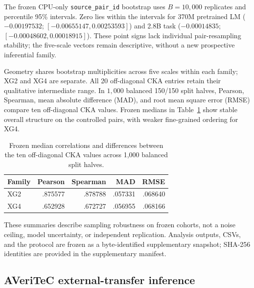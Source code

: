 The frozen CPU-only \texttt{source\_pair\_id} bootstrap uses $B=10{,}000$
replicates and percentile 95\% intervals. Zero lies within the intervals
for 370M pretrained LM ($-0.00197532$; $[-0.00655147,0.00253593]$)
and 2.8B task ($-0.00014835$; $[-0.00048602,0.00018915]$). These point
signs lack individual pair-resampling stability; the five-scale vectors
remain descriptive, without a new prospective inferential family.

Geometry shares bootstrap multiplicities across five scales within each
family; XG2 and XG4 are separate. All 20 off-diagonal CKA entries retain
their qualitative intermediate range. In $1{,}000$ balanced 150/150
split halves, Pearson, Spearman, mean absolute difference (MAD), and root
mean square error (RMSE) compare ten off-diagonal CKA values. Frozen
medians in Table~\ref{tab:robustness} show stable overall structure on
the controlled pairs, with weaker fine-grained ordering for XG4.

\begin{table}[h]
\centering\small
\caption{Frozen median correlations and differences between the ten
off-diagonal CKA values across 1,000 balanced split halves.}
\label{tab:robustness}
\begin{tabular}{lrrrr}
\toprule
Family & Pearson & Spearman & MAD & RMSE \\
\midrule
XG2 & .875577 & .878788 & .057331 & .068640 \\
XG4 & .652928 & .672727 & .056955 & .068166 \\
\bottomrule
\end{tabular}
\end{table}

These summaries describe sampling robustness on frozen cohorts, not a
noise ceiling, model uncertainty, or independent replication. Analysis
outputs, CSVs, and the protocol are frozen as a byte-identified
supplementary snapshot; SHA-256 identities are provided in the
supplementary manifest.

\subsection{AVeriTeC external-transfer inference}
\label{app:external}

